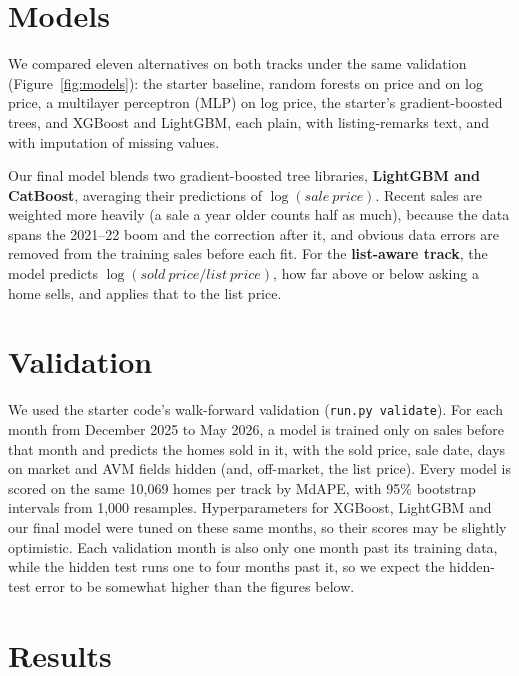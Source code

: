\documentclass[11pt,a4paper]{article}
\begin{document}
\section{Models}

We compared eleven alternatives on both tracks under the same validation
(Figure~\ref{fig:models}): the starter baseline, random forests on price and on log price, a
multilayer perceptron (MLP) on log price, the starter's gradient-boosted trees, and XGBoost and
LightGBM, each plain, with listing-remarks text, and with imputation of missing values.

Our final model blends two gradient-boosted tree libraries, \textbf{LightGBM and CatBoost},
averaging their predictions of $\log(\mathit{sale\ price})$. Recent sales are weighted more
heavily (a sale a year older counts half as much), because the data spans the 2021--22 boom and
the correction after it, and obvious data errors are removed from the training sales before
each fit. For the \textbf{list-aware track}, the model predicts
$\log(\mathit{sold\ price} / \mathit{list\ price})$, how far above or below asking a home sells,
and applies that to the list price.

\section{Validation}

We used the starter code's walk-forward validation (\texttt{run.py validate}). For each month
from December 2025 to May 2026, a model is trained only on sales before that month and predicts
the homes sold in it, with the sold price, sale date, days on market and AVM fields hidden (and,
off-market, the list price). Every model is scored on the same 10,069 homes per track by MdAPE,
with 95\% bootstrap intervals from 1,000 resamples. Hyperparameters for XGBoost, LightGBM and
our final model were tuned on these same months, so their scores may be slightly optimistic.
Each validation month is also only one month past its training data, while the hidden test runs
one to four months past it, so we expect the hidden-test error to be somewhat higher than the
figures below.

\section{Results}
\end{document}
